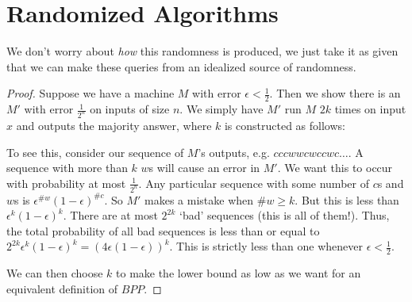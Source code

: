 





\section*{Randomized Algorithms}


We don't worry about \textit{how} this randomness is produced, we just take it as given that we can make these queries from an idealized source of randomness.




\begin{proof}
	Suppose we have a machine $M$ with error $\epsilon < \frac{1}{2}$.  Then we show there is an $M'$ with error $\frac{1}{2^n}$ on inputs of size $n$.  We simply have $M'$ run $M$ $2k$ times on input $x$ and outputs the majority answer, where $k$ is constructed as follows:
	
	To see this, consider our sequence of $M$'s outputs, e.g. $cccwwcwccwc\dots$.  A sequence with more than $k$ $w$s will cause an error in $M'$.  We want this to occur with probability at most $\frac{1}{2^n}$.  Any particular sequence with some number of $c$s and $w$s is $\epsilon^{\#w}(1-\epsilon)^{\#c}$.  So $M'$ makes a mistake when $\#w\geq k$.  But this is less than $\epsilon^k (1-\epsilon)^{k}$.  There are at most $2^{2k}$ `bad' sequences (this is all of them!).  Thus, the total probability of all bad sequences is less than or equal to $2^{2k}\epsilon^k (1-\epsilon)^k = (4\epsilon(1-\epsilon))^k$.  This is strictly less than one whenever $\epsilon<\frac{1}{2}$.
	
	We can then choose $k$ to make the lower bound as low as we want for an equivalent definition of $BPP$.
\end{proof}

